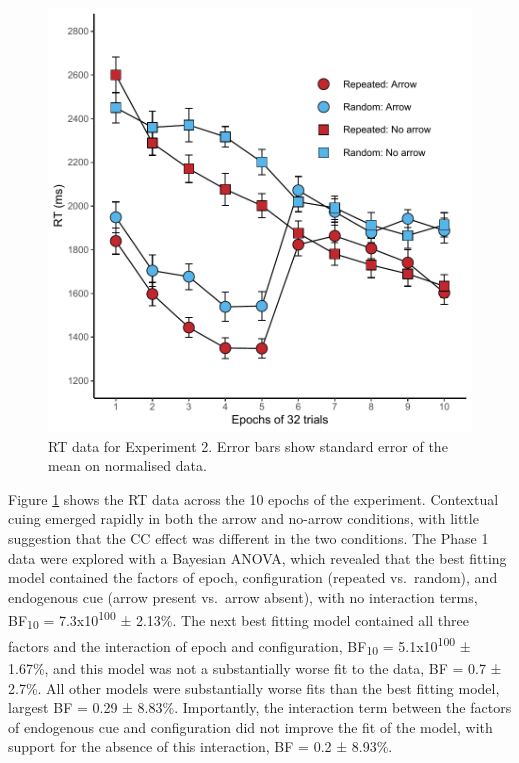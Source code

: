 \documentclass[
  man,floatsintext]{apa7}
\begin{document}
\begin{figure}

{\centering \includegraphics{CCC_ms1_files/figure-latex/Exp2-RT-figure-1} 

}

\caption{RT data for Experiment 2. Error bars show standard error of the mean on normalised data.}\label{fig:Exp2-RT-figure}
\end{figure}



Figure \ref{fig:Exp2-RT-figure} shows the RT data across the 10 epochs of the experiment. Contextual cuing emerged rapidly in both the arrow and no-arrow conditions, with little suggestion that the CC effect was different in the two conditions. The Phase 1 data were explored with a Bayesian ANOVA, which revealed that the best fitting model contained the factors of epoch, configuration (repeated vs.~random), and endogenous cue (arrow present vs.~arrow absent), with no interaction terms, BF\textsubscript{10} = 7.3x10\textsuperscript{100} ± 2.13\%. The next best fitting model contained all three factors and the interaction of epoch and configuration, BF\textsubscript{10} = 5.1x10\textsuperscript{100} ± 1.67\%, and this model was not a substantially worse fit to the data, BF = 0.7 ± 2.7\%. All other models were substantially worse fits than the best fitting model, largest BF = 0.29 ± 8.83\%. Importantly, the interaction term between the factors of endogenous cue and configuration did not improve the fit of the model, with support for the absence of this interaction, BF = 0.2 ± 8.93\%.
\end{document}
